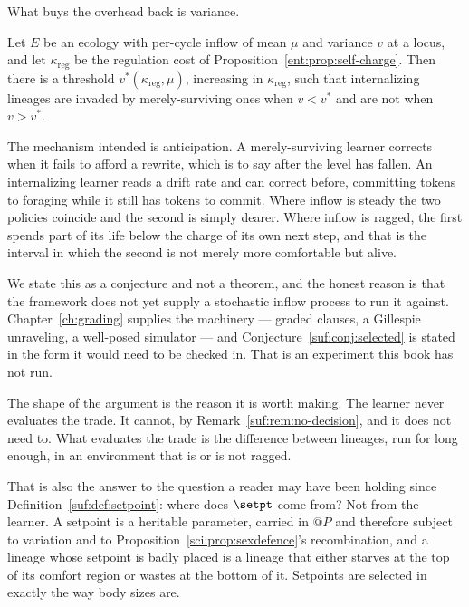 What buys the overhead back is variance.

\begin{conjecture}
\label{suf:conj:selected}
Let $E$ be an ecology with per-cycle inflow of mean $\mu$ and variance
$v$ at a locus, and let $\kappa_{\mathrm{reg}}$ be the regulation cost of
Proposition~\ref{ent:prop:self-charge}.
Then there is a threshold $v^\ast(\kappa_{\mathrm{reg}}, \mu)$, increasing
in $\kappa_{\mathrm{reg}}$, such that internalizing lineages are invaded
by merely-surviving ones when $v < v^\ast$ and are not when $v > v^\ast$.
\end{conjecture}

The mechanism intended is anticipation.
A merely-surviving learner corrects when it fails to afford a rewrite,
which is to say after the level has fallen.
An internalizing learner reads a drift rate and can correct before,
committing tokens to foraging while it still has tokens to commit.
Where inflow is steady the two policies coincide and the second is simply
dearer.
Where inflow is ragged, the first spends part of its life below the
charge of its own next step, and that is the interval in which the second
is not merely more comfortable but alive.

We state this as a conjecture and not a theorem, and the honest reason is
that the framework does not yet supply a stochastic inflow process to run
it against.
Chapter~\ref{ch:grading} supplies the machinery --- graded clauses, a
Gillespie unraveling, a well-posed simulator --- and
Conjecture~\ref{suf:conj:selected} is stated in the form it would need
to be checked in.
That is an experiment this book has not run.

\begin{remark}
\label{suf:rem:nobody-chose}
The shape of the argument is the reason it is worth making.
The learner never evaluates the trade.
It cannot, by Remark~\ref{suf:rem:no-decision}, and it does not need to.
What evaluates the trade is the difference between lineages, run for long
enough, in an environment that is or is not ragged.

That is also the answer to the question a reader may have been holding
since Definition~\ref{suf:def:setpoint}: where does $\setpt$ come from?
Not from the learner.
A setpoint is a heritable parameter, carried in $@P$ and therefore subject
to variation and to Proposition~\ref{sci:prop:sexdefence}'s recombination,
and a lineage whose setpoint is badly placed is a lineage that either
starves at the top of its comfort region or wastes at the bottom of it.
Setpoints are selected in exactly the way body sizes are.
\end{remark}

